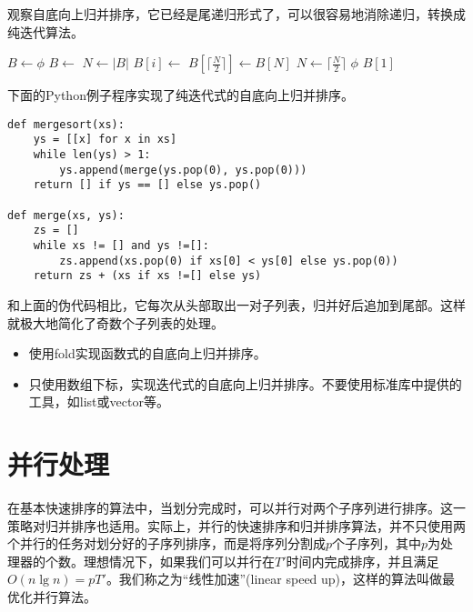 \documentclass[UTF8]{article}
\begin{document}
观察自底向上归并排序，它已经是尾递归形式了，可以很容易地消除递归，转换成纯迭代算法。

\begin{algorithmic}[1]
  \State $B \gets \phi$
    \State $B \gets$ 
  \EndFor
  \State $N \gets |B|$
      \State $B[i] \gets$ 
    \EndFor
      \State $B[\lceil \frac{N}{2} \rceil] \gets B[N]$
    \EndIf
    \State $N \gets \lceil \frac{N}{2} \rceil$
  \EndWhile
    \State \Return $\phi$
  \EndIf
  \State \Return $B[1]$
\EndFunction
\end{algorithmic}

下面的Python例子程序实现了纯迭代式的自底向上归并排序。

\lstset{language=Python}
\begin{lstlisting}
def mergesort(xs):
    ys = [[x] for x in xs]
    while len(ys) > 1:
        ys.append(merge(ys.pop(0), ys.pop(0)))
    return [] if ys == [] else ys.pop()

def merge(xs, ys):
    zs = []
    while xs != [] and ys !=[]:
        zs.append(xs.pop(0) if xs[0] < ys[0] else ys.pop(0))
    return zs + (xs if xs !=[] else ys)
\end{lstlisting}

和上面的伪代码相比，它每次从头部取出一对子列表，归并好后追加到尾部。这样就极大地简化了奇数个子列表的处理。

\begin{Exercise}
\begin{itemize}
\item 使用fold实现函数式的自底向上归并排序。
\item 只使用数组下标，实现迭代式的自底向上归并排序。不要使用标准库中提供的工具，如list或vector等。
\end{itemize}
\end{Exercise}

\section{并行处理}

在基本快速排序的算法中，当划分完成时，可以并行对两个子序列进行排序。这一策略对归并排序也适用。实际上，并行的快速排序和归并排序算法，并不只使用两个并行的任务对划分好的子序列排序，而是将序列分割成$p$个子序列，其中$p$为处理器的个数。理想情况下，如果我们可以并行在$T'$时间内完成排序，并且满足$O(n \lg n) = p T'$。我们称之为“线性加速”(linear speed up)，这样的算法叫做最优化并行算法。
\end{document}
